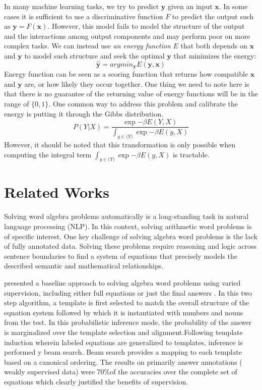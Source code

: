 \documentclass[11pt,letterpaper]{article}
\begin{document}
In many machine learning tasks, we try to predict $\textbf{y}$ given an input $\textbf{x}$. In some cases it is sufficient to use a discriminative function $F$ to predict the output such as $\textbf{y} = F( \textbf{x} )$. However, this model fails to model the structure of the output and the interactions among output components and may perform poor on more complex tasks. We can instead use \textit{an energy function} $E$ that both depends on $\textbf{x}$ and $\textbf{y}$ to model such structure and seek the optimal $\textbf{y}$ that minimizes the energy:
\begin{equation}
\hat{\mathbf{y}} = argmin_{\mathbf{y}} E( \mathbf{y}, \mathbf{x} )
\label{ebm0}
\end{equation}
Energy function can be seen as a scoring function that returns how compatible $\mathbf{x}$ and $\mathbf{y}$ are, or how likely they occur together.
One thing we need to note here is that there is no guarantee of the returning value of energy functions will be in the range of $\{ 0, 1\}$. One common way to address this problem and calibrate the energy is putting it through the Gibbs distribution.
\begin{equation}
P(Y|X) = \frac{ \exp{- \beta E(Y, X)} }{\int_{y \in \mathcal(Y)} \exp{- \beta E(y, X)}  }
\label{ebm1}
\end{equation}
However, it should be noted that this transformation is only possible when computing the integral term $\int_{y \in \mathcal(Y)} \exp{- \beta E(y, X)}$ is tractable.
\section{Related Works}
Solving word algebra problems automatically is a long-standing task in natural language processing (NLP). In this context, solving arithmetic word problems is of specific interest. One key challenge of solving algebra word problems is the lack of fully annotated data. Solving these problems require reasoning and logic across sentence boundaries to find a system of equations that precisely models the described semantic and mathematical relationships.

\citep{Kushman2014LearningTA} presented a baseline approach to solving algebra word problems using varied supervision, including either full equations or just the final answers . In this two step algorithm,  a template is first selected to match the overall structure of the equation system followed by which it is instantiated with numbers and nouns from the test. In this probabilistic inference mode, the probability of the answer is marginalized over the template selection and alignment.Following template induction wherein labeled equations are generalized to templates, inference is performed y beam search. Beam search provides a mapping to each template based on a canonical ordering. The results on primarily answer annotations ( weakly supervised data) were 70\%of the accuracies over the complete set of equations which clearly justified the benefits of supervision. 
\end{document}
